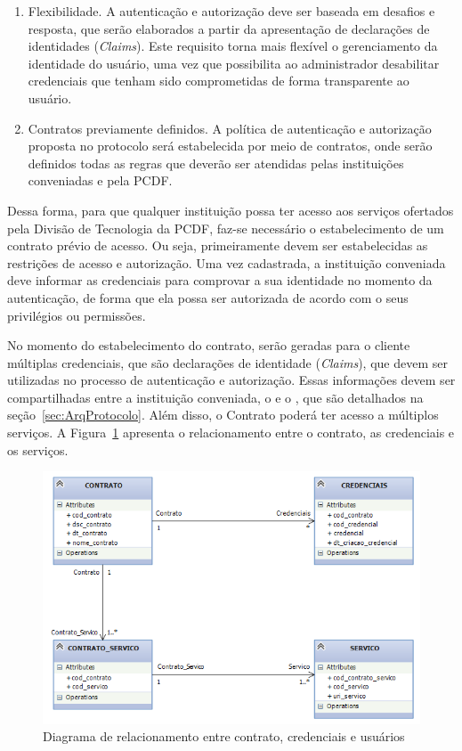 \begin{enumerate}[RQ1]
\item Flexibilidade. A autenticação e autorização deve ser baseada em desafios e resposta, que serão elaborados a partir da apresentação de declarações de identidades (\emph{Claims}). Este requisito torna mais flexível o gerenciamento da identidade do usuário, uma vez que possibilita ao administrador desabilitar credenciais que tenham sido comprometidas de forma transparente ao usuário.

\item Contratos previamente definidos. A política de autenticação e autorização proposta no protocolo será estabelecida por meio de contratos, onde serão definidos todas as regras que deverão ser atendidas pelas instituições conveniadas e pela PCDF.

\end{enumerate}

Dessa forma, para que qualquer instituição possa ter acesso aos serviços ofertados pela Divisão de Tecnologia da PCDF, faz-se necessário o estabelecimento de um contrato prévio de acesso. Ou seja, primeiramente devem ser estabelecidas as restrições de acesso e autorização. Uma vez cadastrada, a instituição conveniada deve informar as credenciais para comprovar a sua identidade no momento da autenticação, de forma que ela possa ser autorizada de acordo com o seus privilégios ou permissões.

No momento do estabelecimento do contrato, serão geradas para o cliente múltiplas credenciais, que são declarações de identidade (\emph{Claims}), que devem ser utilizadas no processo de autenticação e autorização. Essas informações devem ser compartilhadas entre a instituição conveniada, o \servidorAA e o \servidorRest, que são detalhados na seção~\ref{sec:ArqProtocolo}. Além disso, o Contrato poderá ter acesso a múltiplos serviços. A Figura~\ref{fig:diagrama_relacionamento} apresenta o relacionamento entre o contrato, as credenciais e os serviços.

\begin{figure}[!htb]
    \centering
    \includegraphics[width=1.0\textwidth]{modelo_relacionamento_contrato_2.png}
    \caption{Diagrama de relacionamento entre contrato, credenciais e usuários}
    \label{fig:diagrama_relacionamento}
\end{figure}


